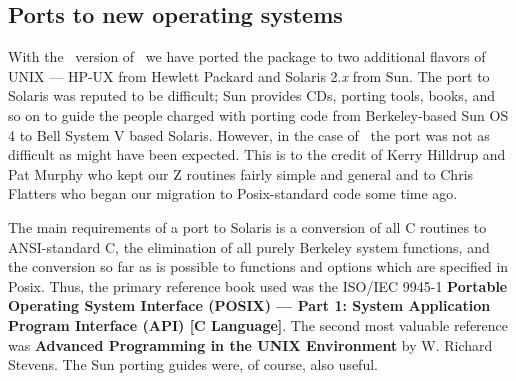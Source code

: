 \subsection{Ports to new operating systems}

With the \RELEASENAME\ version of \AIPS\ we have ported the package to
two additional flavors of UNIX --- HP-UX from Hewlett Packard and
Solaris 2.{\it x} from Sun.  The port to Solaris was reputed to be
difficult; Sun provides CDs, porting tools, books, and so on to guide
the people charged with porting code from Berkeley-based Sun OS 4 to
Bell System V based Solaris.  However, in the case of \AIPS\ the port
was not as difficult as might have been expected.  This is to the
credit of Kerry Hilldrup and Pat Murphy who kept our Z routines fairly
simple and general and to Chris Flatters who began our migration to
Posix-standard code some time ago.

The main requirements of a port to Solaris is a conversion of all C
routines to ANSI-standard C, the elimination of all purely Berkeley
system functions, and the conversion so far as is possible to
functions and options which are specified in Posix.  Thus, the primary
reference book used was the ISO/IEC \mbox{9945-1} {\bf Portable Operating
System Interface (POSIX) --- Part 1: System Application Program
Interface (API) [C Language]}.  The second most valuable reference was
{\bf Advanced Programming in the UNIX Environment} by W. Richard
Stevens.  The Sun porting guides were, of course, also useful.

